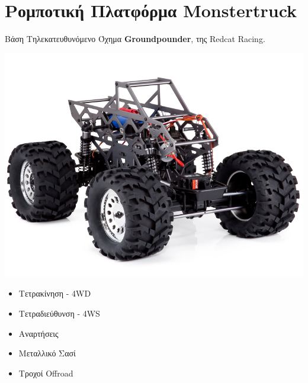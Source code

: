 \documentclass[10pt, compress]{beamer}
\begin{document}
\section{Ρομποτική Πλατφόρμα Monstertruck}

\begin{frame}{Βάση}
	Τηλεκατευθυνόμενο Όχημα \textbf{Groundpounder}, της Redcat Racing.\\[1cm]
	
	\begin{minipage}{0.55\textwidth}
		\includegraphics[width=\textwidth]{Figures/groundpounder.jpg}
	\end{minipage}
	\begin{minipage}{0.4\textwidth}
		\begin{itemize}
			\item Τετρακίνηση - 4WD
			\item Τετραδιεύθυνση - 4WS
			\item Αναρτήσεις
			\item Μεταλλικό Σασί
			\item Τροχοί Offroad
		\end{itemize}
	\end{minipage}
	
\end{frame}
\end{document}
